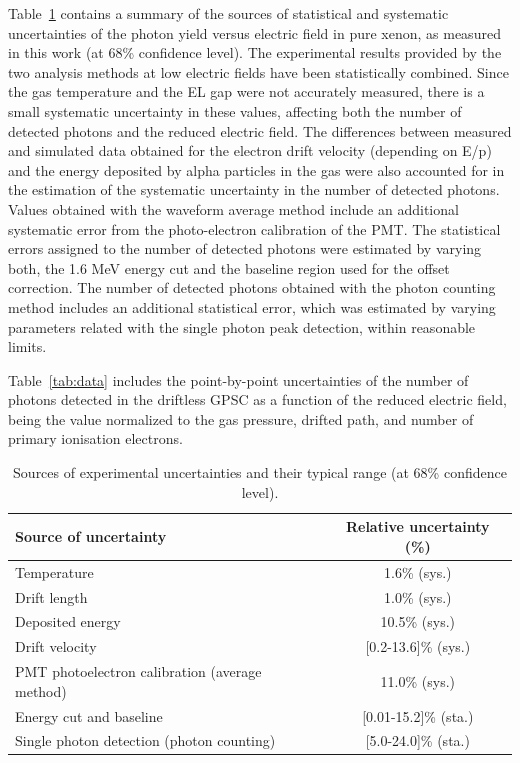 \documentclass[%
 reprint,
superscriptaddress,
 amsmath,amssymb,
 aps,
]{revtex4-2}
\begin{document}
Table~\ref{tab:sources} contains a summary of the sources of statistical and systematic uncertainties of the photon yield versus electric field in pure xenon, as measured in this work (at 68\% confidence level). The experimental results provided by the two analysis methods at low electric fields have been statistically combined. Since the gas temperature and the EL gap were not accurately measured, there is a small systematic uncertainty in these values, affecting both the number of detected photons and the reduced electric field. The differences between measured and simulated data obtained for the electron drift velocity (depending on E/p) and the energy deposited by alpha particles in the gas were also accounted for in the estimation of the systematic uncertainty in the number of detected photons. Values obtained with the waveform average method include an additional systematic error from the photo-electron calibration of the PMT.
The statistical errors assigned to the number of detected photons were estimated by varying  both, the 1.6 MeV energy cut and the baseline region used for the offset correction. The number of detected photons obtained with the photon counting method includes an additional statistical error, which was estimated by varying parameters related with the single photon peak detection, within reasonable limits.    

Table~\ref{tab:data} includes the point-by-point uncertainties of the number of photons detected in the driftless GPSC as a function of the reduced electric field, being the value normalized to the gas pressure, drifted path, and number of primary ionisation electrons. 

\begin{table}[t!]
\centering
\begin{tabular}{l c}
\hline \hline
Source of uncertainty & Relative uncertainty (\%) \\
\hline
Temperature & 1.6\% (sys.)\\
Drift length & 1.0\% (sys.)\\
Deposited energy & 10.5\% (sys.)\\
Drift velocity & [0.2-13.6]\% (sys.)\\
PMT photoelectron calibration (average method) & 11.0\% (sys.)\\
Energy cut and baseline & [0.01-15.2]\% (sta.)\\
Single photon detection (photon counting) & [5.0-24.0]\% (sta.)\\
\hline
\end{tabular}
\caption{\label{tab:sources} Sources of experimental uncertainties and their typical range (at 68\% confidence level).}
\end{table}
\end{document}
